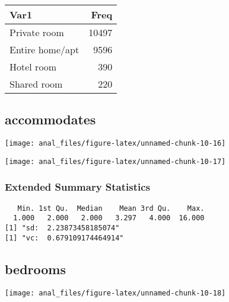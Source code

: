\begin{table}[H]
\centering
\begin{tabular}[t]{lr}
\toprule
Var1 & Freq\\
\midrule
Private room & 10497\\
Entire home/apt & 9596\\
Hotel room & 390\\
Shared room & 220\\
\bottomrule
\end{tabular}
\end{table}
\pagebreak

\centering

\hypertarget{accommodates}{%
\subsection{accommodates}\label{accommodates}}

\begin{center}\texttt{[image: anal\_files/figure-latex/unnamed-chunk-10-16]} \end{center}

\begin{center}\texttt{[image: anal\_files/figure-latex/unnamed-chunk-10-17]} \end{center}

\hypertarget{extended-summary-statistics-1}{%
\subsubsection{Extended Summary
Statistics}\label{extended-summary-statistics-1}}

\begin{verbatim}   Min. 1st Qu.  Median    Mean 3rd Qu.    Max. 
  1.000   2.000   2.000   3.297   4.000  16.000 
[1] "sd:  2.23873458185074"
[1] "vc:  0.679109174464914"
\end{verbatim}

\pagebreak

\centering

\hypertarget{bedrooms}{%
\subsection{bedrooms}\label{bedrooms}}

\begin{center}\texttt{[image: anal\_files/figure-latex/unnamed-chunk-10-18]} \end{center}

